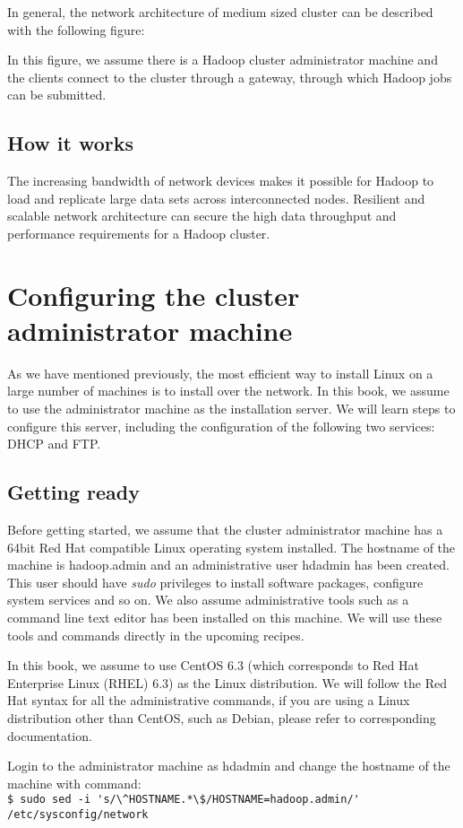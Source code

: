 In general, the network architecture of medium sized cluster can be described with the following figure:

In this figure, we assume there is a Hadoop cluster administrator machine and the clients connect to the cluster through a gateway, through which Hadoop jobs can be submitted.
\subsection*{How it works}
The increasing bandwidth of network devices makes it possible for Hadoop to load and replicate large data sets across interconnected nodes. Resilient and scalable network architecture can secure the high data throughput and performance requirements for a Hadoop cluster.

\section{Configuring the cluster administrator machine}
As we have mentioned previously, the most efficient way to install Linux on a large number of machines is to install over the network. In this book, we assume to use the administrator machine as the installation server. We will learn steps to configure this server, including the configuration of the following two services: DHCP and FTP.

\subsection*{Getting ready}
Before getting started, we assume that the cluster administrator machine has a 64bit Red Hat compatible Linux operating system installed. The hostname of the machine is hadoop.admin and an administrative user hdadmin has been created. This user should have \emph{sudo} privileges to install software packages, configure system services and so on. We also assume administrative tools such as a command line text editor has been installed on this machine. We will use these tools and commands directly in the upcoming recipes.

In this book, we assume to use CentOS 6.3 (which corresponds to Red Hat Enterprise Linux (RHEL) 6.3) as the Linux distribution. We will follow the Red Hat syntax for all the administrative commands, if you are using a Linux distribution other than CentOS, such as Debian, please refer to corresponding documentation.

Login to the administrator machine as hdadmin and change the hostname of the machine with command: \\
\verb|$ sudo sed -i 's/\^HOSTNAME.*\$/HOSTNAME=hadoop.admin/' /etc/sysconfig/network|

